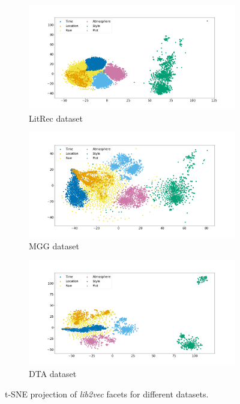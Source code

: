 \documentclass[11pt]{article}
\begin{document}
\begin{figure}[h]
	\begin{subfigure}{\linewidth}
		\centering
		\includegraphics[width=\textwidth,trim={5cm 0 4.4cm 0},clip]{figures/facet_projection_litrec_raw}
		\caption{LitRec dataset}
		\label{fig:tsne_litrec}
	\end{subfigure}

	\begin{subfigure}{\linewidth}
		\centering
		\includegraphics[width=\linewidth,trim={5cm 0 4.4cm 0},clip]{figures/facet_projection_goodreads_raw}
		\caption{MGG dataset}
		\label{fig:tsne_gcc}
	\end{subfigure}
	
	\begin{subfigure}{\linewidth}
		\centering
		\includegraphics[width=\linewidth,trim={5cm 0 4.4cm 0},clip]{figures/facet_projection_dta_raw}
		\caption{DTA dataset}
		\label{fig:tsne_dta}
	\end{subfigure}
	\caption{t-SNE projection of \emph{lib2vec} facets for different datasets.}
	\label{fig:tsne}
\end{figure}
\end{document}

